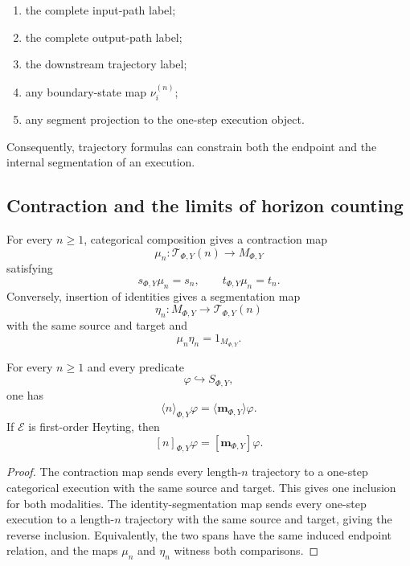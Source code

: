 \begin{enumerate}
\item the complete input-path label;
\item the complete output-path label;
\item the downstream trajectory label;
\item any boundary-state map \(\nu_i^{(n)}\);
\item any segment projection to the one-step execution object.
\end{enumerate}

Consequently, trajectory formulas can constrain both the endpoint and the
internal segmentation of an execution.

\subsection{Contraction and the limits of horizon counting}
\label{subsec:dynamic-trajectory-contraction-collapse}

For every \(n\geq1\), categorical composition gives a contraction map
\[
    \mu_n:
    \mathscr T_{\Phi,Y}(n)\to M_{\Phi,Y}
\]
satisfying
\[
    s_{\Phi,Y}\mu_n=s_n,
    \qquad
    t_{\Phi,Y}\mu_n=t_n.
\]
Conversely, insertion of identities gives a segmentation map
\[
    \eta_n:
    M_{\Phi,Y}\to\mathscr T_{\Phi,Y}(n)
\]
with the same source and target and
\[
    \mu_n\eta_n=1_{M_{\Phi,Y}}.
\]

\begin{proposition}
\label{prop:dynamic-unrestricted-endpoint-collapse}
For every \(n\geq1\) and every predicate
\[
    \varphi\hookrightarrow S_{\Phi,Y},
\]
one has
\[
    \langle n\rangle_{\Phi,Y}\varphi
    =
    \langle\mathbf m_{\Phi,Y}\rangle\varphi.
\]
If \(\mathcal E\) is first-order Heyting, then
\[
    [n]_{\Phi,Y}\varphi
    =
    [\mathbf m_{\Phi,Y}]\varphi.
\]
\end{proposition}

\begin{proof}
The contraction map sends every length-\(n\) trajectory to a one-step
categorical execution with the same source and target.  This gives one
inclusion for both modalities.  The identity-segmentation map sends every
one-step execution to a length-\(n\) trajectory with the same source and
target, giving the reverse inclusion.  Equivalently, the two spans have the
same induced endpoint relation, and the maps \(\mu_n\) and \(\eta_n\) witness
both comparisons.
\end{proof}

